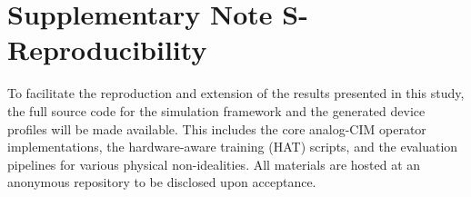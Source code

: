 
\section*{Supplementary Note S-Reproducibility}
\label{supp:reproducibility}

To facilitate the reproduction and extension of the results presented in this study, the full source code for the simulation framework and the generated device profiles will be made available. This includes the core analog-CIM operator implementations, the hardware-aware training (HAT) scripts, and the evaluation pipelines for various physical non-idealities. All materials are hosted at an anonymous repository to be disclosed upon acceptance.
